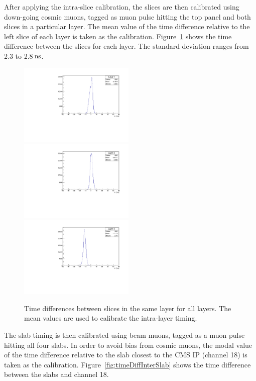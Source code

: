 \documentclass[12pt]{article}
\newcommand{\unit}[1]{\ensuremath{\text{\,#1}}\xspace}
\begin{document}
After applying the intra-slice calibration, the slices are then calibrated using down-going cosmic muons, tagged as muon pulse hitting the top panel and both slices in a particular layer.
The mean value of the time difference relative to the left slice of each layer is taken as the calibration.
Figure~\ref{fig:timeDiffIntraLayer} shows the time difference between the slices for each layer.
The standard deviation ranges from 2.3 to 2.8\unit{ns}.

\begin{figure}
\centering
    \includegraphics[width=0.49\textwidth]{figures/timingPlots/intraLayer/Layer_1.pdf}~
    \includegraphics[width=0.49\textwidth]{figures/timingPlots/intraLayer/Layer_2.pdf}\\
    \includegraphics[width=0.49\textwidth]{figures/timingPlots/intraLayer/Layer_3.pdf}
    \caption{\label{fig:timeDiffIntraLayer} Time differences between slices in the same layer for all layers. The mean values are used to calibrate the intra-layer timing.}
\end{figure}

The slab timing is then calibrated using beam muons, tagged as a muon pulse 
hitting all four slabs. In order to avoid bias from cosmic muons, the modal 
value of the time difference relative to the slab closest to the CMS IP (channel 18) 
is taken as the calibration. Figure~\ref{fig:timeDiffInterSlab} shows
the time difference between the slabs and channel 18. 
\end{document}
